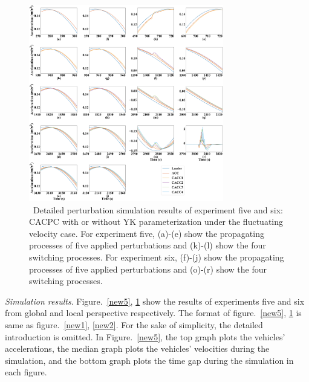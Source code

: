 \documentclass[journal]{IEEEtran}
\begin{document}
\begin{figure}
  \centering
  \includegraphics[width=8.5cm]{figs/fluat_detail.png}
  \caption{~Detailed perturbation simulation results of experiment five and six: CACPC with or without YK parameterization under the fluctuating velocity case. For experiment five, (a)-(e) show the propagating processes of five applied perturbations and (k)-(l) show the four switching processes. For experiment six, (f)-(j) show the propagating processes of five applied perturbations and (o)-(r) show the four switching processes.}
  \label{new6}
\end{figure}




\textit{Simulation results}. Figure.~\ref{new5}, \ref{new6} show the results of experiments five and six from global and local perspective respectively. The format of figure.~\ref{new5}, \ref{new6} is same as figure.~\ref{new1}, \ref{new2}. For the sake of simplicity, the detailed introduction is omitted. In Figure.~\ref{new5}, the top graph plots the vehicles' accelerations, the median graph plots the vehicles' velocities during the simulation, and the bottom graph plots the time gap during the simulation in each figure.
\end{document}
